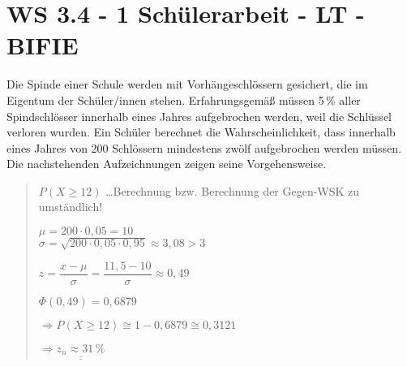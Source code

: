 \section{WS 3.4 - 1 Schülerarbeit - LT - BIFIE}

\begin{beispiel}[WS 3.4]{1} %
Die Spinde einer Schule werden mit Vorhängeschlössern gesichert, die im Eigentum der Schüler/innen stehen. Erfahrungsgemäß müssen 5\,\% aller Spindschlösser innerhalb eines Jahres
aufgebrochen werden, weil die Schlüssel verloren wurden. Ein Schüler berechnet die Wahrscheinlichkeit, dass innerhalb eines Jahres von 200 Schlössern mindestens zwölf aufgebrochen
werden müssen. Die nachstehenden Aufzeichnungen zeigen seine Vorgehensweise. 

\begin{quote}
\footnotesize
\color[rgb]{0.3,0.3,0.3}
$P(X\geq12)$ \ldots Berechnung bzw. Berechnung der Gegen-WSK zu umständlich!

$\mu= 200\cdot 0,05 =10$ \\
$\sigma=\sqrt{200 \cdot 0,05\cdot 0,95} \approx 3,08 > 3$ \checkmark \leer

$z=\dfrac{x - \mu}{\sigma}=\dfrac{11,5 - 10}{\sigma} \approx 0,49$ \leer

$\Phi(0,49) = 0,6879$

$\Rightarrow P(X\geq 12)\cong 1 - 0,6879 \cong 0,3121$

$\Rightarrow \underline{\underline{z_n \approx 31\,\%}}$

\end{quote}
\color[rgb]{0,0,0} \vspace{-0.7cm}\leer

\normalsize
{}



\end{beispiel}